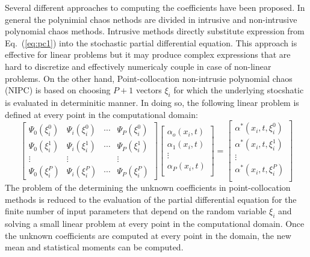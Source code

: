 \documentclass[]{aiaa-tc}%
\begin{document}
Several different approaches to computing the coefficients have been proposed\cite{hosder:aiaa2010}. In general the polynimial chaos nethods are divided in intrusive and non-intrusive polynomial chaos methods. Intrusive methods directly substitute expression from Eq.~(\ref{eq:pc1}) into the stochastic partial differential equation. This approach is effective for linear problems but it may produce complex expressions that are hard to discretize and effectively numericaly couple in case of non-linear problems. On the other hand, Point-collocation non-intrusie polynomial chaos (NIPC) is based on choosing $P+1$ vectors $\xi_i$ for which the underlying stocshatic is evaluated in determinitic manner. In doing so, the following linear problem is defined at every point in the computational domain:\cite{hosder:aiaa2010}
\begin{equation}\label{eq:pc2}
\left[
\begin{array}{cccc}
 \Psi_0(\xi_i^0) & \Psi_i(\xi_i^0) & \cdots & \Psi_P(\xi_i^0) \\
 \Psi_0(\xi_i^1) & \Psi_i(\xi_i^1) & \cdots & \Psi_P(\xi_i^1) \\
 \vdots         &  \vdots         &        & \vdots          \\
 \Psi_0(\xi_i^P) & \Psi_i(\xi_i^P) & \cdots & \Psi_P(\xi_i^P)
\end{array}
\right]
\left[
\begin{array}{c}
\alpha_o(x_i,t)\\
\alpha_1(x_i,t)\\
\vdots\\
\alpha_P(x_i,t)\\
\end{array}
\right]
=
\left[
\begin{array}{c}
\alpha^*(x_i,t,\xi_i^0)\\
\alpha^*(x_i,t,\xi_i^1)\\
\vdots\\
\alpha^*(x_i,t,\xi_i^P)\\
\end{array}
\right]
\end{equation}
The problem of the determining the unknown coefficients in point-collocation methods is reduced to the evaluation of the partial differential equation for the
finite number of input parameters that depend on the random variable $\xi_i$ and solving a small linear problem at every point in the computational domain. Once the unknown coefficients are computed at every point in the domain, the new mean and statistical moments can be computed.
\end{document}
